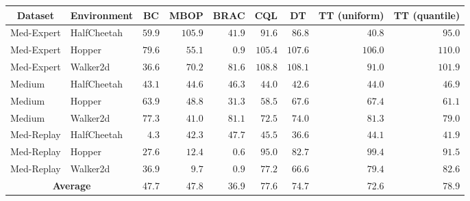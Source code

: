 \begin{table}
\centering
\small
\begin{tabular*}{\textwidth}{@{\extracolsep{\fill}}llrrrrrrr}
\toprule
\multicolumn{1}{c}{\bf Dataset} & \multicolumn{1}{c}{\bf Environment} & \multicolumn{1}{c}{\bf BC} & \multicolumn{1}{c}{\bf MBOP} & \multicolumn{1}{c}{\bf BRAC} & \multicolumn{1}{c}{\bf CQL} & \multicolumn{1}{c}{\bf DT} & \multicolumn{1}{c}{\bf TT \scriptsize{\textcolor{cgrey}{(uniform)}}} & \multicolumn{1}{c}{\bf TT \scriptsize{\textcolor{cgrey}{(quantile)}}} \\ 
\midrule
Med-Expert & HalfCheetah & $59.9$ & $105.9$ & $41.9$ & $91.6$ & $86.8$ & $40.8$ \scriptsize{\raisebox{1pt}{$\pm 2.3$}} & $95.0$ \scriptsize{\raisebox{1pt}{$\pm 0.2$}} \\ 
Med-Expert & Hopper & $79.6$ & $55.1$ & $0.9$ & $105.4$ & $107.6$ & $106.0$ \scriptsize{\raisebox{1pt}{$\pm 0.28$}} & $110.0$ \scriptsize{\raisebox{1pt}{$\pm 2.7$}} \\ 
Med-Expert & Walker2d & $36.6$ & $70.2$ & $81.6$ & $108.8$ & $108.1$ & $91.0$ \scriptsize{\raisebox{1pt}{$\pm 2.8$}} & $101.9$ \scriptsize{\raisebox{1pt}{$\pm 6.8$}} \\ 
\midrule
Medium & HalfCheetah & $43.1$ & $44.6$ & $46.3$ & $44.0$ & $42.6$ & $44.0$ \scriptsize{\raisebox{1pt}{$\pm 0.31$}} & $46.9$ \scriptsize{\raisebox{1pt}{$\pm 0.4$}} \\ 
Medium & Hopper & $63.9$ & $48.8$ & $31.3$ & $58.5$ & $67.6$ & $67.4$ \scriptsize{\raisebox{1pt}{$\pm 2.9$}} & $61.1$ \scriptsize{\raisebox{1pt}{$\pm 3.6$}} \\ 
Medium & Walker2d & $77.3$ & $41.0$ & $81.1$ & $72.5$ & $74.0$ & $81.3$ \scriptsize{\raisebox{1pt}{$\pm 2.1$}} & $79.0$ \scriptsize{\raisebox{1pt}{$\pm 2.8$}} \\ 
\midrule
Med-Replay & HalfCheetah & $4.3$ & $42.3$ & $47.7$ & $45.5$ & $36.6$ & $44.1$ \scriptsize{\raisebox{1pt}{$\pm 0.9$}} & $41.9$ \scriptsize{\raisebox{1pt}{$\pm 2.5$}} \\ 
Med-Replay & Hopper & $27.6$ & $12.4$ & $0.6$ & $95.0$ & $82.7$ & $99.4$ \scriptsize{\raisebox{1pt}{$\pm 3.2$}} & $91.5$ \scriptsize{\raisebox{1pt}{$\pm 3.6$}} \\ 
Med-Replay & Walker2d & $36.9$ & $9.7$ & $0.9$ & $77.2$ & $66.6$ & $79.4$ \scriptsize{\raisebox{1pt}{$\pm 3.3$}} & $82.6$ \scriptsize{\raisebox{1pt}{$\pm 6.9$}} \\ 
\midrule
\multicolumn{2}{c}{\bf Average} & 47.7 & 47.8 & 36.9 & 77.6 & 74.7 & 72.6 \hspace{.6cm} & 78.9 \hspace{.6cm} \\ 

\end{tabular*}
\end{table}
